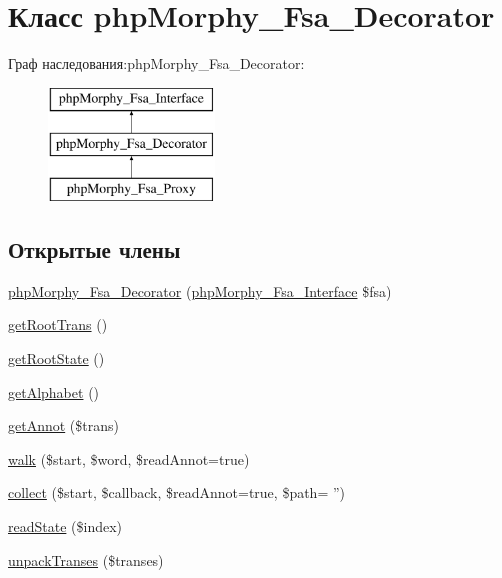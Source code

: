 \hypertarget{classphpMorphy__Fsa__Decorator}{
\section{Класс phpMorphy\_\-Fsa\_\-Decorator}
\label{classphpMorphy__Fsa__Decorator}
}
Граф наследования:phpMorphy\_\-Fsa\_\-Decorator:\begin{figure}[H]
\begin{center}
\leavevmode
\includegraphics[height=3.000000cm]{classphpMorphy__Fsa__Decorator}
\end{center}
\end{figure}
\subsection*{Открытые члены}
\begin{DoxyCompactItemize}
\item 
\hyperlink{classphpMorphy__Fsa__Decorator_abbcea7adce8a2b7c6708cdc023d91562}{phpMorphy\_\-Fsa\_\-Decorator} (\hyperlink{interfacephpMorphy__Fsa__Interface}{phpMorphy\_\-Fsa\_\-Interface} \$fsa)
\item 
\hyperlink{classphpMorphy__Fsa__Decorator_a6f57e120a5763deda17bdb5f96a01290}{getRootTrans} ()
\item 
\hyperlink{classphpMorphy__Fsa__Decorator_a49ee10a47a3d3be7782ec31b97da357d}{getRootState} ()
\item 
\hyperlink{classphpMorphy__Fsa__Decorator_ab817952e793cdb42668409b761758975}{getAlphabet} ()
\item 
\hyperlink{classphpMorphy__Fsa__Decorator_aa67e667c49cbfc163c885bf3cc9a448d}{getAnnot} (\$trans)
\item 
\hyperlink{classphpMorphy__Fsa__Decorator_a18393b870712e635c13c9f18780311e9}{walk} (\$start, \$word, \$readAnnot=true)
\item 
\hyperlink{classphpMorphy__Fsa__Decorator_a207b7b3f35c2eb0d5e23905a02ed5e3d}{collect} (\$start, \$callback, \$readAnnot=true, \$path= '')
\item 
\hyperlink{classphpMorphy__Fsa__Decorator_ae7a286424b3d2d24eb0b64fa2621d83f}{readState} (\$index)
\item 
\hyperlink{classphpMorphy__Fsa__Decorator_a4bdcae49dab742086c961f73e0380254}{unpackTranses} (\$transes)
\end{DoxyCompactItemize}
